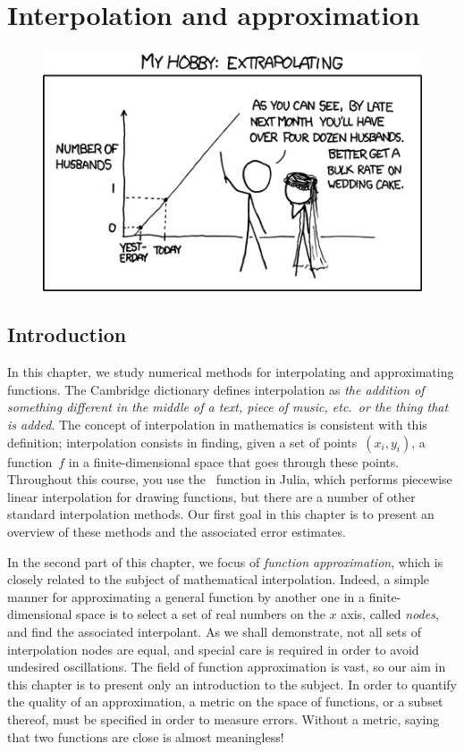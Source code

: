 \chapter{Interpolation and approximation}%
\label{cha:interpolation_and_approximation}

\minitoc

\begin{figure}[ht]
    \centering
    \includegraphics[width=0.5\linewidth]{figures/extrapolating.png}
\end{figure}

\section*{Introduction}
In this chapter,
we study numerical methods for interpolating and approximating functions.
The Cambridge dictionary defines interpolation as \emph{the addition of something different in the middle of a text, piece of music, etc.~or the thing that is added}.
The concept of interpolation in mathematics is consistent with this definition;
interpolation consists in finding, given a set of points~$(x_i, y_i)$,
a function~$f$ in a finite-dimensional space that goes through these points.
Throughout this course, you use the~ function in Julia,
which performs piecewise linear interpolation for drawing functions,
but there are a number of other standard interpolation methods.
Our first goal in this chapter is to present an overview of these methods and the associated error estimates.

In the second part of this chapter,
we focus of \emph{function approximation},
which is closely related to the subject of mathematical interpolation.
Indeed, a simple manner for approximating a general function by another one in a finite-dimensional space is to select a set of real numbers on the $x$ axis,
called \emph{nodes}, and find the associated interpolant.
As we shall demonstrate, not all sets of interpolation nodes are equal,
and special care is required in order to avoid undesired oscillations.
The field of function approximation is vast,
so our aim in this chapter is to present only an introduction to the subject.
In order to quantify the quality of an approximation,
a metric on the space of functions,
or a subset thereof, must be specified in order to measure errors.
Without a metric, saying that two functions are close is almost meaningless!

